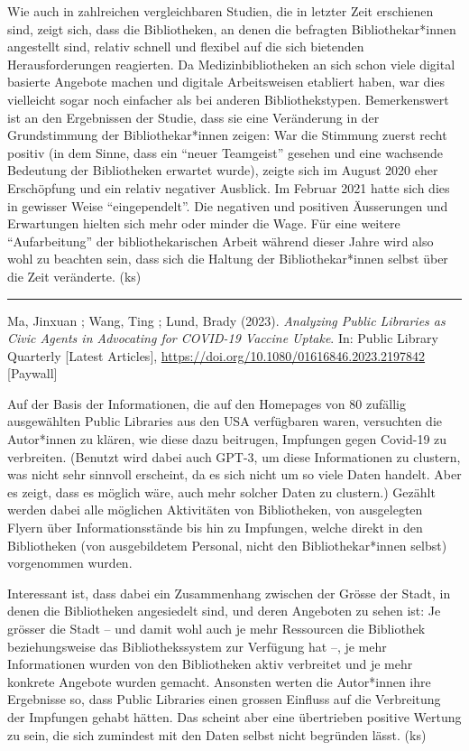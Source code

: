 \documentclass[a4paper,
fontsize=11pt,
oneside,
numbers=noperiodatend,
parskip=half-,
bibliography=totoc,
final
]{scrartcl}
\begin{document}
Wie auch in zahlreichen vergleichbaren Studien, die in letzter Zeit
erschienen sind, zeigt sich, dass die Bibliotheken, an denen die
befragten Bibliothekar*innen angestellt sind, relativ schnell und
flexibel auf die sich bietenden Herausforderungen reagierten. Da
Medizinbibliotheken an sich schon viele digital basierte Angebote machen
und digitale Arbeitsweisen etabliert haben, war dies vielleicht sogar
noch einfacher als bei anderen Bibliothekstypen. Bemerkenswert ist an
den Ergebnissen der Studie, dass sie eine Veränderung in der
Grundstimmung der Bibliothekar*innen zeigen: War die Stimmung zuerst
recht positiv (in dem Sinne, dass ein \enquote{neuer Teamgeist} gesehen
und eine wachsende Bedeutung der Bibliotheken erwartet wurde), zeigte
sich im August 2020 eher Erschöpfung und ein relativ negativer Ausblick.
Im Februar 2021 hatte sich dies in gewisser Weise
\enquote{eingependelt}. Die negativen und positiven Äusserungen und
Erwartungen hielten sich mehr oder minder die Wage. Für eine weitere
\enquote{Aufarbeitung} der bibliothekarischen Arbeit während dieser
Jahre wird also wohl zu beachten sein, dass sich die Haltung der
Bibliothekar*innen selbst über die Zeit veränderte. (ks)

\begin{center}\rule{0.5\linewidth}{0.5pt}\end{center}

Ma, Jinxuan ; Wang, Ting ; Lund, Brady (2023). \emph{Analyzing Public
Libraries as Civic Agents in Advocating for COVID-19 Vaccine Uptake}.
In: Public Library Quarterly {[}Latest Articles{]},
\url{https://doi.org/10.1080/01616846.2023.2197842} {[}Paywall{]}

Auf der Basis der Informationen, die auf den Homepages von 80 zufällig
ausgewählten Public Libraries aus den USA verfügbaren waren, versuchten
die Autor*innen zu klären, wie diese dazu beitrugen, Impfungen gegen
Covid-19 zu verbreiten. (Benutzt wird dabei auch GPT-3, um diese
Informationen zu clustern, was nicht sehr sinnvoll erscheint, da es sich
nicht um so viele Daten handelt. Aber es zeigt, dass es möglich wäre,
auch mehr solcher Daten zu clustern.) Gezählt werden dabei alle
möglichen Aktivitäten von Bibliotheken, von ausgelegten Flyern über
Informationsstände bis hin zu Impfungen, welche direkt in den
Bibliotheken (von ausgebildetem Personal, nicht den Bibliothekar*innen
selbst) vorgenommen wurden.

Interessant ist, dass dabei ein Zusammenhang zwischen der Grösse der
Stadt, in denen die Bibliotheken angesiedelt sind, und deren Angeboten
zu sehen ist: Je grösser die Stadt -- und damit wohl auch je mehr
Ressourcen die Bibliothek beziehungsweise das Bibliothekssystem zur
Verfügung hat --, je mehr Informationen wurden von den Bibliotheken
aktiv verbreitet und je mehr konkrete Angebote wurden gemacht. Ansonsten
werten die Autor*innen ihre Ergebnisse so, dass Public Libraries einen
grossen Einfluss auf die Verbreitung der Impfungen gehabt hätten. Das
scheint aber eine übertrieben positive Wertung zu sein, die sich
zumindest mit den Daten selbst nicht begründen lässt. (ks)
\end{document}
